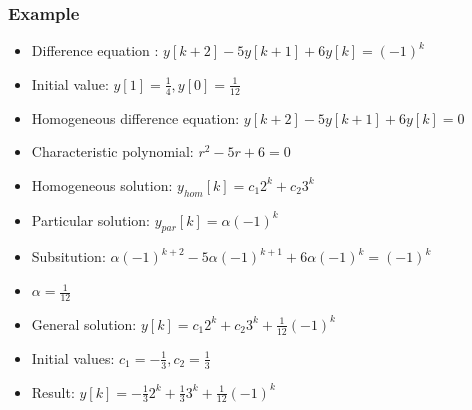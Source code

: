 \begin{frame}
	\frametitle{Example}
	\begin{example}
		\begin{itemize}
			\setlength\itemsep{0em}
			\item Difference equation : $y[k+2] - 5y[k+1]+6y[k]=(-1)^k$
			\item Initial value:  $y[1] = \frac{1}{4}, y[0] = \frac{1}{12}$
			\item Homogeneous difference equation: $y[k+2] - 5y[k+1]+6y[k] = 0$
			\item Characteristic polynomial: $r^2-5r+6 = 0$
			\item Homogeneous solution: $y_{hom}[k] = c_{1}2^{k} + c_{2}3^{k}$
			\item Particular solution: $y_{par}[k] = \alpha(-1)^k$
			\item Subsitution: $\alpha(-1)^{k+2}-5\alpha(-1)^{k+1}+6\alpha(-1)^k = (-1)^k$
			\item $\alpha = \frac{1}{12}$
			\item General solution: $y[k] = c_{1}2^{k}+c_{2}3^{k}+\frac{1}{12}(-1)^{k}$
			\item Initial values: $c_1 = -\frac{1}{3}, c_{2} = \frac{1}{3}$
			\item Result:  $y[k]= -\frac{1}{3}2^{k}+\frac{1}{3}3^{k}+\frac{1}{12}(-1)^{k}$
		\end{itemize}
	\end{example}

\end{frame}
